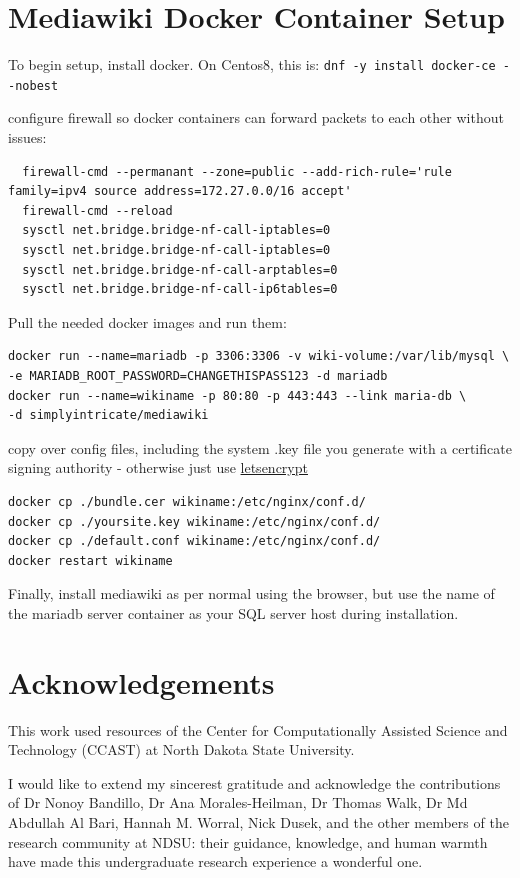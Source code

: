 \documentclass[12pt, letterpaper,oneocolumn]{article}
\begin{document}
\begin{appendices}
\section{Mediawiki Docker Container
Setup}
To begin setup, install docker. On Centos8, this is:
\texttt{dnf\ -y\ install\ docker-ce\ -\/-nobest}

configure firewall so docker containers can forward packets to each
other without issues:
\lstset{language=BASH}
\begin{lstlisting}
  firewall-cmd --permanant --zone=public --add-rich-rule='rule family=ipv4 source address=172.27.0.0/16 accept'
  firewall-cmd --reload
  sysctl net.bridge.bridge-nf-call-iptables=0
  sysctl net.bridge.bridge-nf-call-iptables=0
  sysctl net.bridge.bridge-nf-call-arptables=0
  sysctl net.bridge.bridge-nf-call-ip6tables=0
\end{lstlisting}
Pull the needed docker images and run them:
\begin{lstlisting}
docker run --name=mariadb -p 3306:3306 -v wiki-volume:/var/lib/mysql \
-e MARIADB_ROOT_PASSWORD=CHANGETHISPASS123 -d mariadb
docker run --name=wikiname -p 80:80 -p 443:443 --link maria-db \
-d simplyintricate/mediawiki
\end{lstlisting}
copy over config files, including the system .key file you generate with
a certificate signing authority - otherwise just use
\href{https://letsencrypt.org/}{letsencrypt}
\begin{lstlisting}
docker cp ./bundle.cer wikiname:/etc/nginx/conf.d/
docker cp ./yoursite.key wikiname:/etc/nginx/conf.d/
docker cp ./default.conf wikiname:/etc/nginx/conf.d/
docker restart wikiname
\end{lstlisting}

Finally, install mediawiki as per normal using the browser, but use the name of the mariadb server container as your SQL server host during installation.

\section{Acknowledgements}
	This work used resources of the Center for Computationally Assisted Science and Technology (CCAST) at North Dakota State University.

	I would like to extend my sincerest gratitude and acknowledge the contributions of Dr Nonoy Bandillo, Dr Ana Morales-Heilman, Dr Thomas Walk, Dr Md Abdullah Al Bari, Hannah M. Worral, Nick Dusek, and the other members of the research community at NDSU: their guidance, knowledge, and human warmth have made this undergraduate research experience a wonderful one.


\end{appendices}
\end{document}
